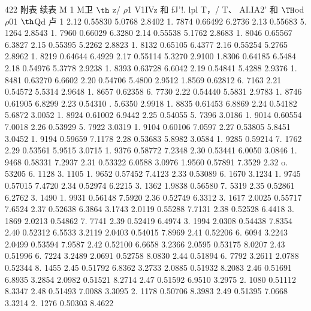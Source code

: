 422 附表 续表 M 1 M卫 ${\rm þ}$ z/ $\rho$1 V1IVz 和 fJ'!. lpl T，/ T、 AI.IA2' 和 ${\rm Þ}$od $\rho$01 ${\rm þ}$Qd 卢 1 2.12 0.55830 5.0768 2.8402 1. 7874 0.66492 6.2736 2.13 0.55683 5. 1264 2.8543 1. 7960 0.66029 6.3280 2.14 0.55538 5.1762 2.8683 1. 8046 0.65567 6.3827 2.15 0.55395 5.2262 2.8823 1. 8132 0.65105 6.4377 2.16 0.55254 5.2765 2.8962 1. 8219 0.64644 6.4929 2.17 0.55114 5.3270 2.9100 1.8306 0.64185 6.5484 2.18 0.54976 5.3778 2.9238 1. 8393 0.63728 6.6042 2.19 0.54841 5.4288 2.9376 1. 8481 0.63270 6.6602 2.20 0.54706 5.4800 2.9512 1.8569 0.62812 6. 7163 2.21 0.54572 5.5314 2.9648 1. 8657 0.62358 6. 7730 2.22 0.54440 5.5831 2.9783 1. 8746 0.61905 6.8299 2.23 0.54310 . 5.6350 2.9918 1. 8835 0.61453 6.8869 2.24 0.54182 5.6872 3.0052 1. 8924 0.61002 6.9442 2.25 0.54055 5. 7396 3.0186 1. 9014 0.60554 7.0018 2.26 0.53929 5. 7922 3.0319 1. 9104 0.60106 7.0597 2.27 0.53805 5.8451 3.0452 1. 9194 0.59659 7.1178 2.28 0.53683 5.8982 3.0584 1. 9285 0.59214 7. 1762 2.29 0.53561 5.9515 3.0715 1. 9376 0.58772 7.2348 2.30 0.53441 6.0050 3.0846 1. 9468 0.58331 7.2937 2.31 0.53322 6.0588 3.0976 1.9560 0.57891 7.3529 2.32 o. 53205 6. 1128 3. 1105 1. 9652 0.57452 7.4123 2.33 0.53089 6. 1670 3.1234 1. 9745 0.57015 7.4720 2.34 0.52974 6.2215 3. 1362 1.9838 0.56580 7. 5319 2.35 0.52861 6.2762 3. 1490 1. 9931 0.56148 7.5920 2.36 0.52749 6.3312 3. 1617 2.0025 0.55717 7.6524 2.37 0.52638 6.3864 3.1743 2.0119 0.55288 7.7131 2.38 0.52528 6.4418 3. 1869 2.0213 0.54862 7. 7741 2.39 0.52419 6.4974 3. 1994 2.0308 0.54438 7.8354 2.40 0.52312 6.5533 3.2119 2.0403 0.54015 7.8969 2.41 0.52206 6. 6094 3.2243 2.0499 0.53594 7.9587 2.42 0.52100 6.6658 3.2366 2.0595 0.53175 8.0207 2.43 0.51996 6. 7224 3.2489 2.0691 0.52758 8.0830 2.44 0.51894 6. 7792 3.2611 2.0788 0.52344 8. 1455 2.45 0.51792 6.8362 3.2733 2.0885 0.51932 8.2083 2.46 0.51691 6.8935 3.2854 2.0982 0.51521 8.2714 2.47 0.51592 6.9510 3.2975 2. 1080 0.51112 8.3347 2.48 0.51493 7.0088 3.3095 2. 1178 0.50706 8.3983 2.49 0.51395 7.0668 3.3214 2. 1276 0.50303 8.4622

